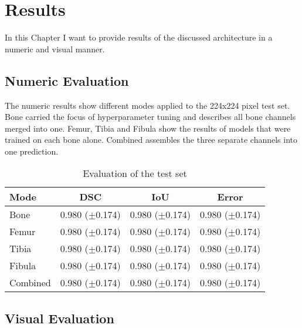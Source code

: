 \section{Results}

In this Chapter I want to provide results of the discussed architecture in a numeric and visual manner.

\subsection{Numeric Evaluation}

The numeric results show different modes applied to the 224x224 pixel test set. Bone carried the focus of hyperparameter tuning and describes all bone channels merged into one. Femur, Tibia and Fibula show the results of models that were trained on each bone alone. Combined assembles the three separate channels into one prediction.

\begin{table}[H]
    \centering
    \begin{tabular}{| l | c | c | c |}
    \hline
    Mode     & DSC                & IoU                & Error             \\ 
    \hline
    \hline
    Bone     & 0.980 ($\pm$0.174) & 0.980 ($\pm$0.174) & 0.980 ($\pm$0.174)\\
    \hline
    Femur    & 0.980 ($\pm$0.174) & 0.980 ($\pm$0.174) & 0.980 ($\pm$0.174)\\
    \hline
    Tibia    & 0.980 ($\pm$0.174) & 0.980 ($\pm$0.174) & 0.980 ($\pm$0.174)\\
    \hline
    Fibula   & 0.980 ($\pm$0.174) & 0.980 ($\pm$0.174) & 0.980 ($\pm$0.174)\\
    \hline
    Combined & 0.980 ($\pm$0.174) & 0.980 ($\pm$0.174) & 0.980 ($\pm$0.174)\\
    \hline
    \end{tabular}
    \caption{Evaluation of the test set}
\end{table}

\subsection{Visual Evaluation}

\newpage